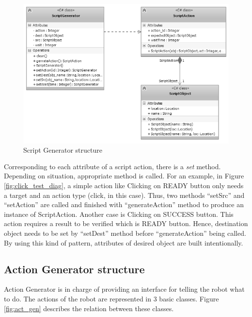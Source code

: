	\begin{figure}[H]
		\centering
		\includegraphics[scale=0.75]{Chapters/Fig/script_gen.png}
		\caption{Script Generator structure}
		\label{fig:script_gen}
	\end{figure}

Corresponding to each attribute of a script action, there is a \textit{set} method. Depending on situation, appropriate method is called. For an example, in Figure \ref{fig:click_test_diag}, a simple action like Clicking on READY button only needs a target and an action type (click, in this case). Thus, two methods ``setSrc'' and ``setAction'' are called and finished with ``generateAction'' method to produce an instance of ScriptAction. Another case is Clicking on SUCCESS button. This action requires a result to be verified which is READY button. Hence, destination object needs to be set by ``setDest'' method before ``generateAction'' being called. By using this kind of pattern, attributes of desired object are built intentionally.

\subsection{Action Generator structure}
Action Generator is in charge of providing an interface for telling the robot what to do. The actions of the robot are represented in 3 basic classes. Figure \ref{fig:act_gen} describes the relation between these classes.

